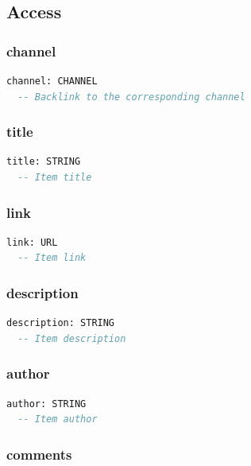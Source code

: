\subsection{Access}
\label{sec:item-access}

\subsubsection{channel}

\begin{lstlisting}[language=Eiffel]
channel: CHANNEL
  -- Backlink to the corresponding channel
\end{lstlisting}

\subsubsection{title}

\begin{lstlisting}[language=Eiffel]
title: STRING
  -- Item title
\end{lstlisting}

\subsubsection{link}

\begin{lstlisting}[language=Eiffel]
link: URL
  -- Item link
\end{lstlisting}

\subsubsection{description}

\begin{lstlisting}[language=Eiffel]
description: STRING
  -- Item description
\end{lstlisting}

\subsubsection{author}

\begin{lstlisting}[language=Eiffel]
author: STRING
  -- Item author
\end{lstlisting}

\subsubsection{comments}

